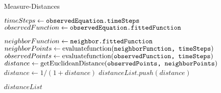 \begin{algorithm}
	\caption{Measure-Distances}
	\label{measureDistances}
	\begin{algorithmic}[1]
		
		\State $timeSteps\gets \texttt{observedEquation.timeSteps}$
		\State $observedFunction\gets \texttt{observedEquation.fittedFunction}$
		
			\State $neighborFunction\gets \texttt{neighbor.fittedFunction}$
			\State $neighborPoints \gets \textrm{evaluatefunction(\texttt{neighborFunction, timeSteps})}$
			\State $observedPoints \gets \textrm{evaluatefunction(\texttt{observedFunction, timeSteps})}$
			\State $distance \gets \textrm{getEuclideanDistance(\texttt{observedPoints, neighborPoints})}$
			\State $distance \gets 1/(1+distance)$
			\State $distanceList.push(distance)$
		\EndFor
		
		\State \Return $distanceList$
	
		\EndProcedure
	\end{algorithmic}
\end{algorithm}


